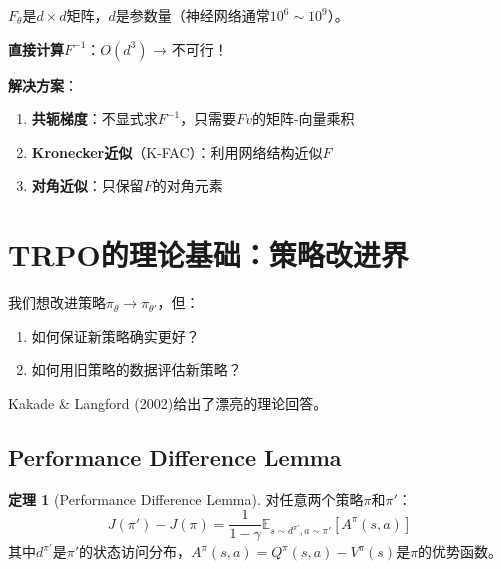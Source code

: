 \documentclass[11pt,a4paper]{article}
\theoremstyle{definition}
\newtheorem{theorem}{定理}[section]
\begin{document}
\begin{calculation}[自然梯度的计算复杂度]
$F_\theta$是$d \times d$矩阵，$d$是参数量（神经网络通常$10^6 \sim 10^9$）。

\textbf{直接计算}$F^{-1}$：$O(d^3)$ → 不可行！

\textbf{解决方案}：
\begin{enumerate}
    \item \textbf{共轭梯度}：不显式求$F^{-1}$，只需要$Fv$的矩阵-向量乘积
    \item \textbf{Kronecker近似}（K-FAC）：利用网络结构近似$F$
    \item \textbf{对角近似}：只保留$F$的对角元素
\end{enumerate}
\end{calculation}

\section{TRPO的理论基础：策略改进界}

\begin{plainwords}[TRPO的核心问题]
我们想改进策略$\pi_\theta \to \pi_{\theta'}$，但：
\begin{enumerate}
    \item 如何保证新策略确实更好？
    \item 如何用旧策略的数据评估新策略？
\end{enumerate}

Kakade \& Langford (2002)给出了漂亮的理论回答。
\end{plainwords}

\subsection{Performance Difference Lemma}

\begin{theorem}[Performance Difference Lemma]
对任意两个策略$\pi$和$\pi'$：
\[
J(\pi') - J(\pi) = \frac{1}{1-\gamma} \mathbb{E}_{s \sim d^{\pi'}, a \sim \pi'}\left[A^\pi(s, a)\right]
\]
其中$d^{\pi'}$是$\pi'$的状态访问分布，$A^\pi(s,a) = Q^\pi(s,a) - V^\pi(s)$是$\pi$的优势函数。
\end{theorem}
\end{document}
